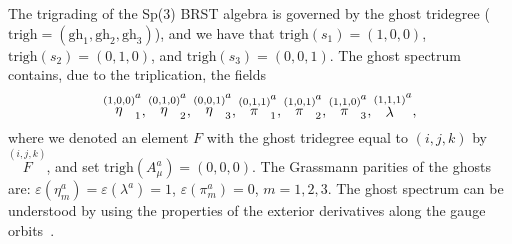 \documentclass[a4paper,10pt]{article}
\begin{document}
The trigrading of the Sp(3) BRST algebra is governed by the ghost tridegree (%
$\mathrm{trigh}=\left( \mathrm{gh}_{1},\mathrm{gh}_{2},\mathrm{gh}%
_{3}\right) $), and we have that $\mathrm{trigh}\left( s_{1}\right) =\left(
1,0,0\right) $, $\mathrm{trigh}\left( s_{2}\right) =\left( 0,1,0\right) $,
and $\mathrm{trigh}\left( s_{3}\right) =\left( 0,0,1\right) $. The ghost
spectrum contains, due to the triplication, the fields 
\begin{equation}
\label{8}
\stackrel{(1,0,0)}{\eta }_{1}^{a},\stackrel{(0,1,0)}{\eta }_{2}^{a},%
\stackrel{(0,0,1)}{\eta }_{3}^{a},\stackrel{(0,1,1)}{\pi }_{1}^{a},\stackrel{%
(1,0,1)}{\pi }_{2}^{a},\stackrel{(1,1,0)}{\pi }_{3}^{a},\stackrel{(1,1,1)}{%
\lambda }^{a},
\end{equation}
where we denoted an element $F$ with the ghost tridegree equal to $\left(
i,j,k\right) $ by $\stackrel{(i,j,k)}{F}$, and set $\mathrm{trigh}\left(
A_{\mu }^{a}\right) =\left( 0,0,0\right) $. The Grassmann parities of the
ghosts are: $\varepsilon \left( \eta _{m}^{a}\right) =\varepsilon \left(
\lambda ^{a}\right) =1$, $\varepsilon \left( \pi _{m}^{a}\right) =0$, $%
m=1,2,3$. The ghost spectrum can be understood by using the properties of
the exterior derivatives along the gauge orbits~\cite{sp3gen}.
\end{document}
